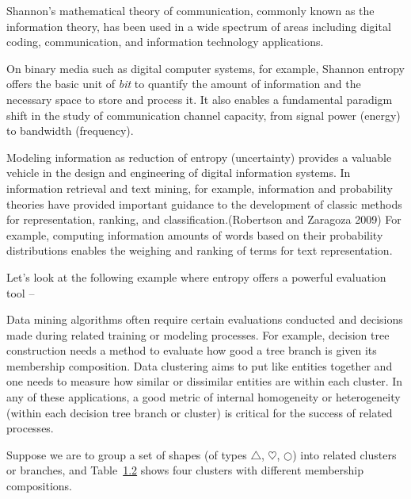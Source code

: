 \documentclass[
  letterpaper,
]{scrbook}
\begin{document}
Shannon's mathematical theory of communication, commonly known as the
information theory, has been used in a wide spectrum of areas including
digital coding, communication, and information technology applications.

On binary media such as digital computer systems, for example, Shannon
entropy offers the basic unit of \emph{bit} to quantify the amount of
information and the necessary space to store and process it. It also
enables a fundamental paradigm shift in the study of communication
channel capacity, from signal power (energy) to bandwidth (frequency).

Modeling information as reduction of entropy (uncertainty) provides a
valuable vehicle in the design and engineering of digital information
systems. In information retrieval and text mining, for example,
information and probability theories have provided important guidance to
the development of classic methods for representation, ranking, and
classification.(Robertson and Zaragoza 2009) For example, computing
information amounts of words based on their probability distributions
enables the weighing and ranking of terms for text representation.

Let's look at the following example where entropy offers a powerful
evaluation tool --

Data mining algorithms often require certain evaluations conducted and
decisions made during related training or modeling processes. For
example, decision tree construction needs a method to evaluate how good
a tree branch is given its membership composition. Data clustering aims
to put like entities together and one needs to measure how similar or
dissimilar entities are within each cluster. In any of these
applications, a good metric of internal homogeneity or heterogeneity
(within each decision tree branch or cluster) is critical for the
success of related processes.

Suppose we are to group a set of shapes (of types \(\triangle\),
\(\heartsuit\), \(\bigcirc\)) into related clusters or branches, and
Table~\hyperref[tab-info-groups]{1.2} shows four clusters with different
membership compositions.
\end{document}
